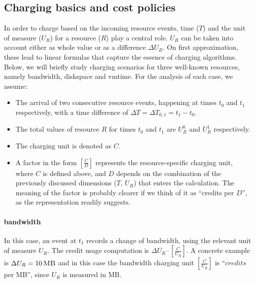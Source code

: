 \documentclass[letterpaper,twocolumn,10pt]{article}
\newcommand{\DTime}{\ensuremath{T}\xspace} %
\newcommand{\DUnitR}{\ensuremath{U_{R}}\xspace} %
\newcommand{\DeltaDUnitR}{\ensuremath{\Delta U_{R}}\xspace}
\newcommand{\MB}[1]{\ensuremath{#1\,\mbox{\sc MB}}}
\begin{document}
\subsection{Charging basics and cost policies}

In order to charge based on the incoming resource events, time (\DTime) and the unit of measure (\DUnitR) for a resource ($R$) play a central role. \DUnitR can be taken into account either as whole value or as a difference \DeltaDUnitR. On first approximation, these lead to linear formulas that capture the essence of charging algorithms. Below, we will briefly  study charging scenarios for three well-known resources, namely \textsf{bandwidth}, \textsf{diskspace} and \textsf{vmtime}. For the analysis of each case, we assume: 
\begin{itemize}
\item The arrival of two consecutive resource events, happening at times $t_0$ and $t_1$ respectively, with a time difference of  $\Delta T = \Delta T_{0, 1} = t_1 - t_0$.

\item The total values of resource $R$ for times $t_0$ and $t_1$ are $U_R^0$ and $U_R^1$ respectively.

\item The charging unit is denoted as $C$. %

\item A factor in the form $[\frac{C}{D}]$ represents the resource-specific charging unit, where $C$ is defined above, and $D$ depends on the combination of the previously discussed dimensions ($T$, $U_R$) that enters the calculation. The meaning of the factor is probably clearer if we think of it as ``credits per $D$'', as the representation readily suggests.
\end{itemize}

\paragraph{\textsf{bandwidth}}
In this case, an event at $t_1$ records a change of bandwidth, using the relevant unit of measure $U_R$.  The credit usage computation is $\Delta U_R \cdot  [ \frac{C}{U_R} ]$.
A concrete example is $\Delta U_R = \MB{10}$ and in this case the bandwidth charging unit $[ \frac{C}{U_R} ]$ is ``$credits$ per {\sc MB}'', since $U_R$ is measured in {\sc MB}.
\end{document}
